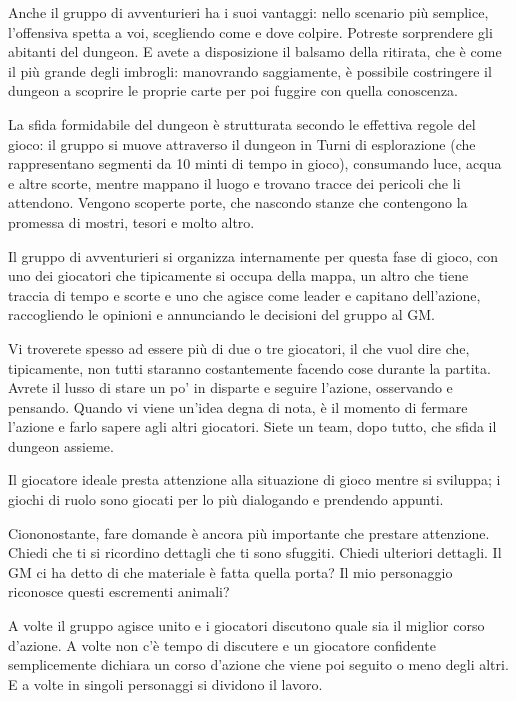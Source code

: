 Anche il gruppo di avventurieri ha i suoi vantaggi: nello scenario più semplice, l'offensiva spetta a voi, scegliendo come e dove colpire. Potreste sorprendere gli abitanti del dungeon. E avete a disposizione il balsamo della ritirata, che è come il più grande degli imbrogli: manovrando saggiamente, è possibile costringere il dungeon a scoprire le proprie carte per poi fuggire con quella conoscenza.


La sfida formidabile del dungeon è strutturata secondo le effettiva regole del gioco: il gruppo si muove attraverso il dungeon in Turni di esplorazione (che rappresentano segmenti da 10 minti di tempo in gioco), consumando luce, acqua e altre scorte, mentre mappano il luogo e trovano tracce dei pericoli che li attendono. Vengono scoperte porte, che nascondo stanze che contengono la promessa di mostri, tesori e molto altro.

Il gruppo di avventurieri si organizza internamente per questa fase di gioco, con uno dei giocatori che tipicamente si occupa della mappa, un altro che tiene traccia di tempo e scorte e uno che agisce come leader e capitano dell'azione, raccogliendo le opinioni e annunciando le decisioni del gruppo al GM.

Vi troverete spesso ad essere più di due o tre giocatori, il che vuol dire che, tipicamente, non tutti staranno costantemente facendo cose durante la partita. Avrete il lusso di stare un po' in disparte e seguire l'azione, osservando e pensando. Quando vi viene un'idea degna di nota, è il momento di fermare l'azione e farlo sapere agli altri giocatori. Siete un team, dopo tutto, che sfida il dungeon assieme.




Il giocatore ideale presta attenzione alla situazione di gioco mentre si sviluppa; i giochi di ruolo sono giocati per lo più dialogando e prendendo appunti.

Ciononostante, fare domande è ancora più importante che prestare attenzione. Chiedi che ti si ricordino dettagli che ti sono sfuggiti. Chiedi ulteriori dettagli. Il GM ci ha detto di che materiale è fatta quella porta? Il mio personaggio riconosce questi escrementi animali?

A volte il gruppo agisce unito e i giocatori discutono quale sia il miglior corso d'azione. A volte non c'è tempo di discutere e un giocatore confidente semplicemente dichiara un corso d'azione che viene poi seguito o meno degli altri. E a volte in singoli personaggi si dividono il lavoro.

